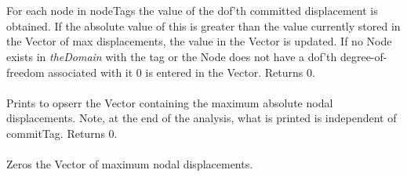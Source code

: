   \\
\\
For each node in \p nodeTags the value of the \p dof'th committed
displacement is obtained. If the absolute value of this is greater
than the value currently stored in the Vector of max displacements,
the value in the Vector is updated. If no Node exists in {\em
theDomain} with the tag or the Node does not have a \p dof'th
degree-of-freedom associated with it $0$ is entered in the
Vector. Returns $0$. \\

\\
Prints to \p opserr the Vector containing the maximum absolute nodal
displacements. Note, at the end of the analysis, what is printed is
independent of \p commitTag. Returns $0$. \\

\\ 
Zeros the Vector of maximum nodal displacements.
